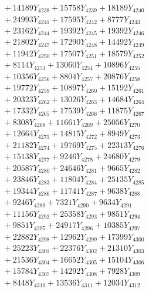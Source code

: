 \documentclass[a4paper,10pt]{article}
\begin{document}
{\begin{align}
&\;  + 14189 Y_{4238} + 15758 Y_{4239} + 18189 Y_{4240} \\[0.3ex]
&\;  + 24993 Y_{4241} + 17595 Y_{4242} + 8777 Y_{4243} \\[0.3ex]
&\;  + 23162 Y_{4244} + 19392 Y_{4245} + 19392 Y_{4246} \\[0.3ex]
&\;  + 21802 Y_{4247} + 17290 Y_{4248} + 14492 Y_{4249} \\[0.3ex]
&\;  + 11942 Y_{4250} + 17507 Y_{4251} + 18579 Y_{4252} \\[0.3ex]
&\;  + 8114 Y_{4253} + 13060 Y_{4254} + 10896 Y_{4255} \\[0.3ex]
&\;  + 10356 Y_{4256} + 8804 Y_{4257} + 20876 Y_{4258} \\[0.5ex]\allowbreak
&\;  + 19772 Y_{4259} + 10897 Y_{4260} + 15192 Y_{4261} \\[0.3ex]
&\;  + 20323 Y_{4262} + 13026 Y_{4263} + 14684 Y_{4264} \\[0.3ex]
&\;  + 17332 Y_{4265} + 17539 Y_{4266} + 11875 Y_{4267} \\[0.3ex]
&\;  + 8308 Y_{4268} + 11661 Y_{4269} + 25056 Y_{4270} \\[0.3ex]
&\;  + 12664 Y_{4271} + 14815 Y_{4272} + 8949 Y_{4273} \\[0.3ex]
&\;  + 21182 Y_{4274} + 19769 Y_{4275} + 22313 Y_{4276} \\[0.3ex]
&\;  + 15138 Y_{4277} + 9246 Y_{4278} + 24680 Y_{4279} \\[0.3ex]
&\;  + 20587 Y_{4280} + 24646 Y_{4281} + 9665 Y_{4282} \\[0.3ex]
&\;  + 23846 Y_{4283} + 11804 Y_{4284} + 25135 Y_{4285} \\[0.3ex]
&\;  + 19344 Y_{4286} + 11741 Y_{4287} + 9638 Y_{4288} \\[0.5ex]\allowbreak
&\;  + 9246 Y_{4289} + 7321 Y_{4290} + 9634 Y_{4291} \\[0.3ex]
&\;  + 11156 Y_{4292} + 25358 Y_{4293} + 9851 Y_{4294} \\[0.3ex]
&\;  + 9851 Y_{4295} + 24917 Y_{4296} + 10385 Y_{4297} \\[0.3ex]
&\;  + 22882 Y_{4298} + 12962 Y_{4299} + 17399 Y_{4300} \\[0.3ex]
&\;  + 25223 Y_{4301} + 22376 Y_{4302} + 21310 Y_{4303} \\[0.3ex]
&\;  + 21536 Y_{4304} + 16652 Y_{4305} + 15104 Y_{4306} \\[0.3ex]
&\;  + 15784 Y_{4307} + 14292 Y_{4308} + 7928 Y_{4309} \\[0.3ex]
&\;  + 8448 Y_{4310} + 13536 Y_{4311} + 12034 Y_{4312} \\[0.3ex]

\end{align}}
\end{document}
